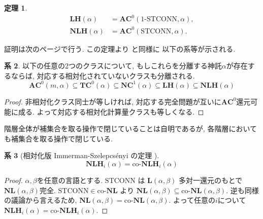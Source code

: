 \documentclass[11pt,a4paper]{jsarticle}
\theoremstyle{definition}
\newtheorem{theorem}{定理}%
\newtheorem{corollary}[theorem]{系}
\theoremstyle{remark}
\newcommand{\classfont}{\mathbf}
\newcommand{\co}{\text{co-}}
\newcommand{\AC}{\classfont{AC}}
\newcommand{\TC}{\classfont{TC}}
\newcommand{\NC}{\classfont{NC}}
\renewcommand{\L}{\classfont{L}}
\newcommand{\NL}{\classfont{NL}}
\newcommand{\LH}{\classfont{LH}}
\newcommand{\NLH}{\classfont{NLH}}
\newcommand{\probfont}{\text}
\newcommand{\oneSTCONN}{\probfont{1-STCONN}}
\newcommand{\STCONN}{\probfont{STCONN}}
\begin{document}
\begin{theorem}
 \label{theorem:main1}
 \begin{align*}
 \LH(\alpha) &= \AC^0(\oneSTCONN, \alpha),
  \\
 \NLH(\alpha) &= \AC^0(\STCONN, \alpha).
 \end{align*}  
\end{theorem}


証明は次のページで行う.
この定理より \cite{aehlig2007relativizing} と同様に
以下の系等が示される.

\begin{corollary}
\label{corollary:start}
以下の任意の2つのクラスについて, 
もしこれらを分離する神託$\alpha$が存在するならば,
対応する相対化されていないクラスも分離される.
\begin{equation*}
 \AC^0(m, \alpha) 
  \subseteq \TC^0(\alpha)
  \subseteq \NC^1(\alpha)
  \subseteq \LH(\alpha)
  \subseteq \NLH(\alpha)
\end{equation*}
\end{corollary}

\begin{proof}
 非相対化クラス同士が等しければ, 
 対応する完全問題が互いに$\AC^0$還元可能に成る.
 よって対応する相対化計算量クラスも等しくなる.
\end{proof}


階層全体が補集合を取る操作で閉じていることは自明であるが,
各階層においても補集合を取る操作で閉じている.
\begin{corollary}
[相対化版 Immerman-Szelepcs{\'e}nyi の定理
{\cite{immerman1988nondeterministic}\cite{szelepcsenyi1988method}}]
\begin{equation*}
 \NLH_i(\alpha) = \co\NLH_i(\alpha) 
\end{equation*}
\end{corollary}

\begin{proof}
 $\alpha, \beta$を任意の言語とする.
 $\STCONN$ は $\L(\alpha, \beta)$ 多対一還元のもとで $\NL(\alpha, \beta)$完全.
 $\STCONN \in \co\NL$ より $\NL(\alpha, \beta) \subseteq \co\NL(\alpha, \beta)$.
 逆も同様の議論から言えるため, $\NL(\alpha, \beta) = \co\NL(\alpha, \beta)$.
 よって任意の$i$について $\NLH_i(\alpha) = \co\NLH_i(\alpha)$.
\end{proof}
\end{document}
